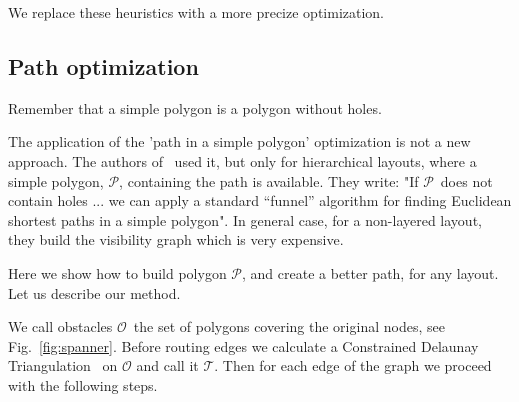 \documentclass{gd-llncs}
\newcommand{\plg}{$\mathcal{P}$}
\begin{document}
We replace these heuristics with a more precize optimization.
\subsection*{Path optimization} {
Remember that a simple polygon is a polygon without holes.

The application of the 'path in a simple polygon' optimization is not a new approach. The authors of~\cite{dobkin1997implementing} used it, but only for hierarchical layouts, where a simple polygon, \plg, containing the path is available. They write: "If \plg~does not contain holes ... we can apply a standard “funnel” algorithm \cite{chazelle1982theorem,hershberger1994computing} for finding Euclidean shortest paths in a simple polygon". In general case, for a non-layered layout, they build the visibility graph which is very expensive.

Here we show how to build polygon \plg, and create a better path, for any layout. Let us describe our method.

We call obstacles $\mathcal{O}$~the set of polygons covering the original nodes, see Fig.~\ref{fig:spanner}. Before routing edges we calculate a Constrained Delaunay Triangulation~\cite{delaunay1934sphere} on $\mathcal{O}$ and call it $\mathcal{T}$. Then for each edge of the graph we proceed with the following steps.

}
\end{document}
